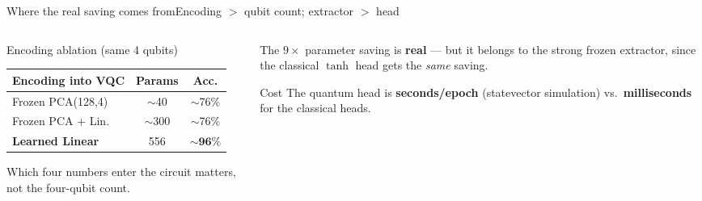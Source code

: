 \begin{frame}{Where the real saving comes from}{Encoding $>$ qubit count; extractor $>$ head}
    \begin{columns}[T]
        \begin{column}{0.5\textwidth}
            \begin{block}{Encoding ablation (same 4 qubits)}
                \centering\small
                \setlength{\tabcolsep}{4pt}
                \begin{tabular}{lcc}
                    \toprule
                    Encoding into VQC       & Params    & Acc.                \\
                    \midrule
                    Frozen PCA(128,4)       & $\sim$40  & $\sim$76\%          \\
                    Frozen PCA + Lin.       & $\sim$300 & $\sim$76\%          \\
                    \textbf{Learned Linear} & 556       & $\mathbf{\sim96\%}$ \\
                    \bottomrule
                \end{tabular}
            \end{block}
            \footnotesize Which four numbers enter the circuit matters, not the
            four-qubit count.
        \end{column}
        \begin{column}{0.5\textwidth}
            \begin{callout}
                The $9\times$ parameter saving is \textbf{real} --- but it belongs to
                the strong frozen extractor, since the classical $\tanh$ head gets the
                \emph{same} saving.
            \end{callout}
            \begin{alertblock}{Cost}
                The quantum head is \textbf{seconds/epoch} (statevector simulation)
                vs.\ \textbf{milliseconds} for the classical heads.
            \end{alertblock}
        \end{column}
    \end{columns}
\end{frame}
